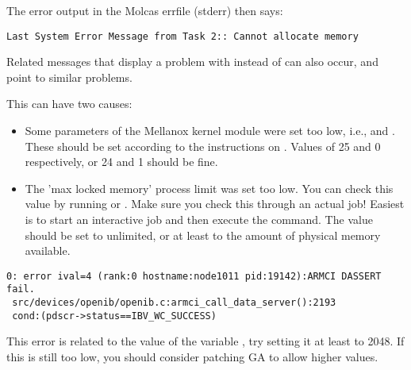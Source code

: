 The error output in the Molcas errfile (stderr) then says:

\begin{verbatim}
Last System Error Message from Task 2:: Cannot allocate memory
\end{verbatim}

Related messages that display a problem with 
instead of  can also occur, and point to similar problems.

This can have two causes:
\begin{itemize}
    \item Some parameters of the Mellanox  kernel module were
        set too low, i.e.,  and .
        These should be set according to the instructions on
        .  Values of 25 and 0
        respectively, or 24 and 1 should be fine.
    \item The 'max locked memory' process limit was set too low. You can check
        this value by running  or . Make
        sure you check this through an actual job! Easiest is to start an
        interactive job and then execute the command. The value should be set
        to unlimited, or at least to the amount of physical memory available.
\end{itemize}

\begin{verbatim}
0: error ival=4 (rank:0 hostname:node1011 pid:19142):ARMCI DASSERT fail.
 src/devices/openib/openib.c:armci_call_data_server():2193
 cond:(pdscr->status==IBV_WC_SUCCESS)
\end{verbatim}

This error is related to the value of the variable
, try setting it at least to 2048. If this is
still too low, you should consider patching GA to allow higher values.
